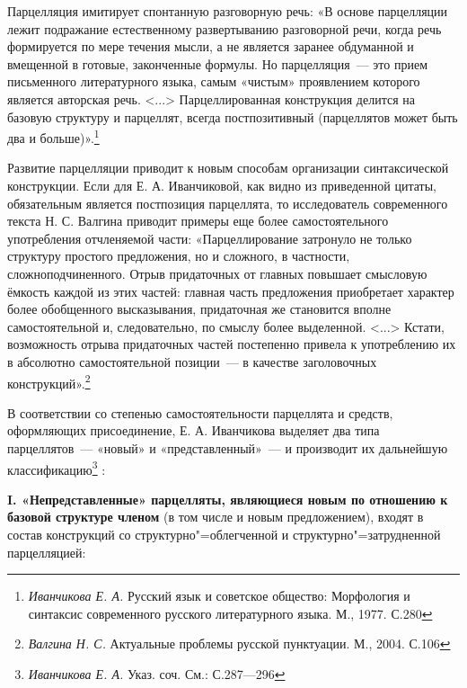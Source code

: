\documentclass{kursa4}
\begin{document}
      {Парцелляция имитирует спонтанную разговорную речь: «В основе парцелляции лежит подражание естественному развертыванию разговорной речи, когда речь формируется по мере течения мысли, а не является заранее обдуманной и вмещенной в готовые, законченные формулы. Но парцелляция~--- это прием письменного литературного языка, самым «чистым» проявлением которого является авторская речь. \textless{}...\textgreater{} Парцеллированная конструкция делится на базовую структуру и парцеллят, }{всегда постпозитивный}{ (парцеллятов может быть два и больше)».}\footnote{\textit{{ Иванчикова Е. А. }}{Русский язык и советское общество: Морфология и синтаксис современного русского литературного языка. М., 1977.}\textit{{
      }}{С.280}}{ }

      {Развитие парцелляции приводит к новым способам организации синтаксической конструкции. Если для Е. А. Иванчиковой, как видно из приведенной цитаты, обязательным является постпозиция парцеллята, то исследователь современного текста Н. С. Валгина приводит примеры еще более самостоятельного употребления отчленяемой части: «Парцеллирование затронуло не только структуру простого предложения, но и сложного, в частности, сложноподчиненного. Отрыв придаточных от главных повышает смысловую ёмкость каждой из этих частей: главная часть предложения }{приобретает характер более обо}{б}{щенного высказывания, придаточная же становится вполне самостоятельной и, следовательно, по смыслу более выделенной. \textless{}...\textgreater{} Кстати, возможность отрыва придаточных частей постепенно привела к употреблению их в абсолютно самостоятельной позиции~--- в качестве заголовочных конструкций».}\footnote{\textit{{ Валгина Н. С. }}{Актуальные проблемы русской пунктуации. М., 2004. С.106}}{ }

      {В соответствии со степенью самостоятельности парцеллята и средств, оформляющих присоединение, Е. А. Иванчикова выделяет два типа парцеллятов~--- «новый» и «представленный»~--- и производит их дальнейшую классификацию}\footnote{\textit{{Иванчикова Е. А. }}{Указ. соч. См.: С.287—296}}{ :}

      \textbf{I. «Непредставленные» парцелляты, являющиеся новым по отношению к базовой структуре членом} (в том числе и новым предложением), входят в состав конструкций со структурно"=облегченной и структурно"=затрудненной парцелляцией:
\end{document}
